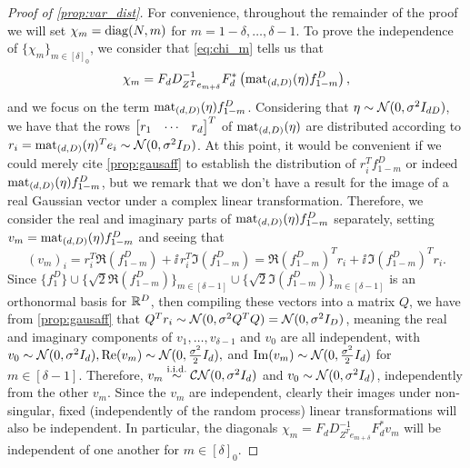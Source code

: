 \begin{proof}[Proof of \cref{prop:var_dist}]
  For convenience, throughout the remainder of the proof we will set $\chi_m = \operatorname{diag}(N, m)$ for $m = 1 - \delta, \ldots, \delta - 1$.  To prove the independence of $\{\chi_m\}_{m \in [\delta]_0}$, we consider that \eqref{eq:chi_m} tells us that \[\chi_m = F_d D^{-1}_{Z^T e_{m + \delta}} F_d^* \left(\operatorname{mat}_{(d, D)}(\eta) f^D_{1 - m}\right),\] and we focus on the term $\operatorname{mat}_{(d, D)}(\eta) f_{1 - m}^D$.  Considering that $\eta \sim \mathcal{N}(0, \sigma^2 I_{d D})$, we have that the rows $\begin{bmatrix} r_{1} & \cdots & r_{d} \end{bmatrix}^T$ of $\operatorname{mat}_{(d, D)}(\eta)$ are distributed according to $r_i = \operatorname{mat}_{(d, D)}(\eta)^T e_i \sim \mathcal{N}(0, \sigma^2 I_D)$.  At this point, it would be convenient if we could merely cite \cref{prop:gausaff} to establish the distribution of $r_i^T f^D_{1 -m }$ or indeed $\operatorname{mat}_{(d, D)}(\eta) f_{1 - m}^D$, but we remark that we don't have a result for the image of a real Gaussian vector under a complex linear transformation.  Therefore, we consider the real and imaginary parts of $\operatorname{mat}_{(d, D)}(\eta) f_{1 - m}^D$ separately, setting $v_m = \operatorname{mat}_{(d, D)}(\eta) f_{1 - m}^D$ and seeing that \[(v_m)_i = r_i^T \Re(f_{1 - m}^D) + \ii\, r_i^T \Im(f_{1 - m}^D) = \Re(f_{1 - m}^D)^T r_i + \ii\, \Im(f_{1 - m}^D)^T r_i.\]  Since $\{f_1^D\} \cup \{\sqrt{2} \Re(f_{1 - m}^D)\}_{m \in [\delta - 1]} \cup \{\sqrt{2} \Im(f_{1 - m}^D)\}_{m \in [\delta - 1]}$ is an orthonormal basis for $\mathbb{R}^D$, then compiling these vectors into a matrix $Q$, we have from \cref{prop:gausaff} that $Q^T r_i \sim \mathcal{N}(0, \sigma^2 Q^T Q) = \mathcal{N}(0, \sigma^2 I_D)$, meaning the real and imaginary components of $v_1, \ldots, v_{\delta - 1}$ and $v_0$ are all independent, with $v_0 \sim \mathcal{N}(0, \sigma^2 I_d), \operatorname{Re}(v_m) \sim \mathcal{N}(0, \frac{\sigma^2}{2} I_d),$ and $\operatorname{Im}(v_m) \sim \mathcal{N}(0, \frac{\sigma^2}{2} I_d)$ for $m \in [\delta - 1]$.  Therefore, $v_m \overset{\text{i.i.d.}}{\sim} \mathcal{C N}(0, \sigma^2 I_d)$ and $v_0 \sim \mathcal{N}(0, \sigma^2 I_d)$, independently from the other $v_m$.  Since the $v_m$ are independent, clearly their images under non-singular, fixed (independently of the random process) linear transformations will also be independent.  In particular, the diagonals $\chi_m = F_d D^{-1}_{Z^T e_{m + \delta}} F_d^* v_m$ will be independent of one another for $m \in [\delta]_0$.


\end{proof}
